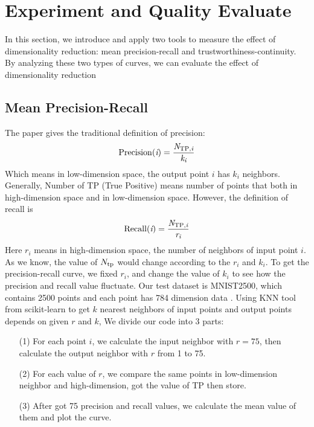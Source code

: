 \documentclass[12pt]{article}
\begin{document}
\section*{Experiment and Quality Evaluate}
In this section, we introduce and apply two tools to measure the effect of dimensionality reduction: mean precision-recall and trustworthiness-continuity. By analyzing these two types of curves, we can evaluate the effect of dimensionality reduction
\subsection*{Mean Precision-Recall}
The paper gives the traditional definition of precision\cite{mean Precision-Recall}:
\begin{equation}
	\rm{Precision}(\emph{i}) = \frac{\emph{N}_{\rm{TP},\emph{i}}}{\emph{k}_{\emph{i}}}
\end{equation}
Which means in low-dimension space, the output point $i$ has $k_{i}$ neighbors. Generally, Number of TP (True Positive) means number of points that both in high-dimension space and in low-dimension space. However, the definition of recall is 
\begin{equation}
	\rm{Recall}(\emph{i}) = \frac{\emph{N}_{\rm{TP}, \emph{i}}}{\emph{r}_{\emph{i}}}
\end{equation}
Here $r_{i}$ means in high-dimension space, the number of neighbors of input point $i$. As we know, the value of $N_{\rm{tp}}$ would change according to the $r_{i}$ and $k_{i}$. To get the precision-recall curve, we fixed $r_{i}$, and change the value of $k_{i}$ to see how the precision and recall value fluctuate.
Our test dataset is MNIST2500, which contains 2500 points and each point has 784 dimension data \cite{MNIST}. Using KNN tool from scikit-learn to get $k$ nearest neighbors of input points and output points depends on given $r$ and $k$, 
We divide our code into 3 parts:
\begin{enumerate}
	\item [(1)]For each point $i$, we calculate the input neighbor with $r=75$, then calculate the output neighbor with $r$ from 1 to 75.
	\item[(2)] For each value of $r$, we compare the same points in low-dimension neighbor and high-dimension, got the value of TP then store.
	\item[(3)] After got 75 precision and recall values, we calculate the mean value of them and plot the curve.
\end{enumerate}
\end{document}
